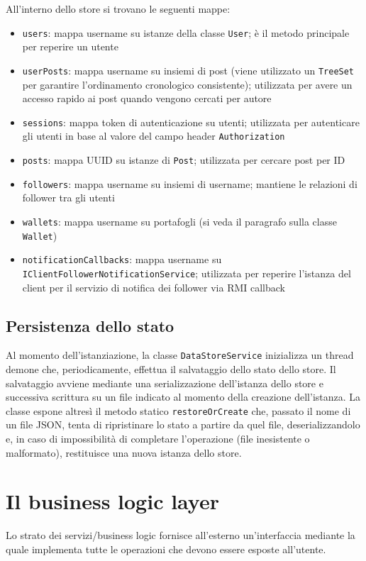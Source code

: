 \documentclass[a4paper,8pt]{article} %
\def\code#1{\texttt{#1}}
\begin{document}
\par All'interno dello store si trovano le seguenti mappe:
\begin{itemize}
    \item \code{users}: mappa username su istanze della classe \code{User}; è il metodo principale per reperire un utente
    \item \code{userPosts}: mappa username su insiemi di post (viene utilizzato un \code{TreeSet} per garantire l'ordinamento cronologico consistente); utilizzata per avere un accesso rapido ai post quando vengono cercati per autore
    \item \code{sessions}: mappa token di autenticazione su utenti; utilizzata per autenticare gli utenti in base al valore del campo header \code{Authorization}
    \item \code{posts}: mappa UUID su istanze di \code{Post}; utilizzata per cercare post per ID
    \item \code{followers}: mappa username su insiemi di username; mantiene le relazioni di follower tra gli utenti
    \item \code{wallets}: mappa username su portafogli (si veda il paragrafo sulla classe \code{Wallet})
    \item \code{notificationCallbacks}: mappa username su \code{IClientFollowerNotificationService}; utilizzata per reperire l'istanza del client per il servizio di notifica dei follower via RMI callback
\end{itemize}
\subsection{Persistenza dello stato}
Al momento dell'istanziazione, la classe \code{DataStoreService} inizializza un thread demone che, periodicamente, effettua il salvataggio dello stato dello store.
Il salvataggio avviene mediante una serializzazione dell'istanza dello store e successiva scrittura su un file indicato al momento della creazione dell'istanza.
La classe espone altresì il metodo statico \code{restoreOrCreate} che, passato il nome di un file JSON, tenta di ripristinare lo stato a partire da quel file, deserializzandolo e, in caso
di impossibilità di completare l'operazione (file inesistente o malformato), restituisce una nuova istanza dello store.


\section{Il business logic layer}
Lo strato dei servizi/business logic fornisce all'esterno un'interfaccia mediante la quale implementa tutte le operazioni che devono essere esposte all'utente.
\end{document}
